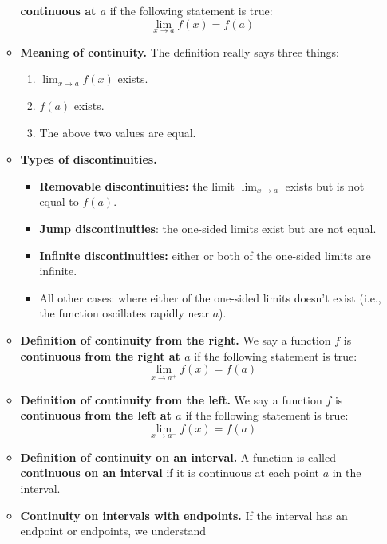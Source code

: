 \documentclass{article}
\newcommand{\ds}{\displaystyle}
\begin{document}
\begin{itemize}
\begin{itemize}
    \textbf{continuous at $a$} if the following statement is true:
    \begin{displaymath}
      \lim_{x\to a} f(x) = f(a)
    \end{displaymath}
  \item \textbf{Meaning of continuity.} The definition really says three things:
    \begin{enumerate}
    \item $\lim_{x\to a} f(x)$ exists.
    \item $f(a)$ exists.
    \item The above two values are equal.
    \end{enumerate}
  \item \textbf{Types of discontinuities.}
    \begin{itemize}
    \item \textbf{Removable discontinuities:} the limit
      $\ds\lim_{x\to a}$ exists but is not equal to $f(a)$.
    \item \textbf{Jump discontinuities}: the one-sided limits
      exist but are not equal.
    \item \textbf{Infinite discontinuities:}
      either or both of the one-sided limits are infinite.
    \item All other cases: where either of the one-sided limits
      doesn't exist (i.e., the function oscillates rapidly near $a$).
    \end{itemize} 
  \item \textbf{Definition of continuity from the right.} 
    We say a function $f$ is
    \textbf{continuous from the right at $a$}
    if the following statement is true:
    \begin{displaymath}
      \lim_{x\to a^+} f(x) = f(a)
    \end{displaymath}
  \item \textbf{Definition of continuity from the left.} 
    We say a function $f$ is
    \textbf{continuous from the left
    at $a$} if the following statement is true:
    \begin{displaymath}
      \lim_{x\to a^-} f(x) = f(a)
    \end{displaymath}
  \item \textbf{Definition of continuity on an interval.} 
    A function is called \textbf{continuous
    on an interval} if it is continuous at each point $a$
    in the interval.
  \item \textbf{Continuity on intervals with endpoints.}
    If the interval has an endpoint or endpoints, we understand

\end{itemize}
\end{itemize}
\end{document}

